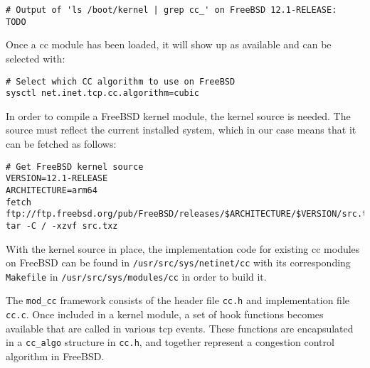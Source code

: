 
\begin{verbatim}
# Output of 'ls /boot/kernel | grep cc_' on FreeBSD 12.1-RELEASE:
TODO
\end{verbatim}
Once a \gls{cc} module has been loaded, it will show up as available and can be selected with:

\begin{verbatim}
# Select which CC algorithm to use on FreeBSD
sysctl net.inet.tcp.cc.algorithm=cubic
\end{verbatim}
In order to compile a FreeBSD kernel module, the kernel source is needed. The source must reflect the current installed system, which in our case means that it can be fetched as follows:

\begin{verbatim}
# Get FreeBSD kernel source
VERSION=12.1-RELEASE
ARCHITECTURE=arm64
fetch ftp://ftp.freebsd.org/pub/FreeBSD/releases/$ARCHITECTURE/$VERSION/src.txz
tar -C / -xzvf src.txz
\end{verbatim}
With the kernel source in place, the implementation code for existing \gls{cc} modules on FreeBSD can be found in \lstinline{/usr/src/sys/netinet/cc} with its corresponding \lstinline{Makefile} in \lstinline{/usr/src/sys/modules/cc} in order to build it.

The \lstinline{mod_cc} framework consists of the header file \lstinline{cc.h} and implementation file \lstinline{cc.c}. Once included in a kernel module, a set of hook functions becomes available that are called in various \gls{tcp} events. These functions are encapsulated in a \lstinline{cc_algo} structure in \lstinline{cc.h}, and together represent a congestion control algorithm in FreeBSD.

